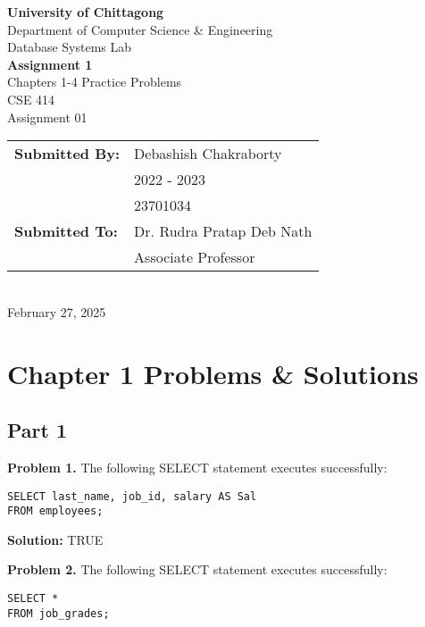 \documentclass[12pt,a4paper]{article}
\begin{document}
\begin{titlepage}
    \centering
    \vspace*{2cm}
    {\Huge\bfseries University of Chittagong}\\[0.5cm]
    {\Large Department of Computer Science \& Engineering}\\[0.5cm]
    {\large Database Systems Lab}\\[2cm]
    
    {\huge\bfseries Assignment 1}\\[0.5cm]
    {\LARGE Chapters 1-4 Practice Problems}\\[0.5cm]
    {\large CSE 414}\\[0.5cm]
    {\Large Assignment 01}\\[3cm]
    
    \begin{tabular}{ll}
        \textbf{Submitted By:} & Debashish Chakraborty\\
        & 2022 - 2023\\
        & 23701034\\[1cm]
        \textbf{Submitted To:} & Dr. Rudra Pratap Deb Nath\\
        & Associate Professor\\
    \end{tabular}\\[2cm]
    
    {\large February 27, 2025}
\end{titlepage}

\newpage
\tableofcontents
\newpage

\section{Chapter 1 Problems \& Solutions}

\subsection{Part 1}

\textbf{Problem 1.} The following SELECT statement executes successfully:
\begin{lstlisting}[style=sqlstyle]
SELECT last_name, job_id, salary AS Sal
FROM employees;
\end{lstlisting}

\textbf{Solution:} TRUE

\textbf{Problem 2.} The following SELECT statement executes successfully:
\begin{lstlisting}[style=sqlstyle]
SELECT *
FROM job_grades;
\end{lstlisting}
\end{document}
